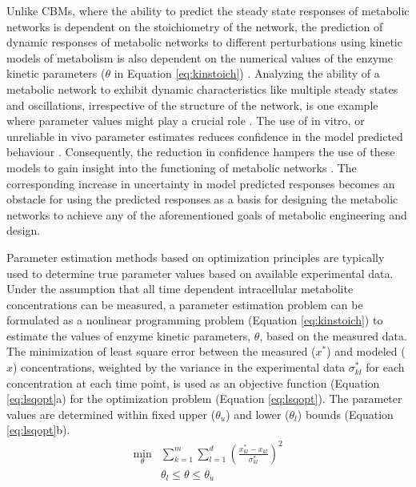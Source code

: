 \documentclass[10pt]{article}
\begin{document}
	Unlike CBMs, where the ability to predict the steady state responses of metabolic networks is dependent on the stoichiometry of the network, the prediction of dynamic responses of metabolic networks to different perturbations using kinetic models of metabolism is also dependent on the numerical values of the enzyme kinetic parameters ($\theta$ in Equation \ref{eq:kinstoich}) \parencite{Andreozzi2016a}. Analyzing the ability of a metabolic network to exhibit dynamic characteristics like multiple steady states and oscillations, irrespective of the structure of the network, is one example where parameter values might play a crucial role \parencite{Srinivasan2015, Vital-Lopez2006}. The use of in vitro, or unreliable in vivo parameter estimates reduces confidence in the model predicted behaviour \parencite{Andreozzi2016a}. Consequently, the reduction in confidence hampers the use of these models to gain insight into the functioning of metabolic networks \parencite{Chakrabarti2013a, Bordbar2015}. The corresponding increase in uncertainty in model predicted responses becomes an obstacle for using the predicted responses as a basis for designing the metabolic networks to achieve any of the aforementioned goals of metabolic engineering and design.  
	
	Parameter estimation methods based on optimization principles are typically used to determine true parameter values based on available experimental data. Under the assumption that all time dependent intracellular metabolite concentrations can be measured, a parameter estimation problem can be formulated as a nonlinear programming problem (Equation \ref{eq:kinstoich}) to estimate the values of enzyme kinetic parameters, $\theta$, based on the measured data. 	
	The minimization of least square error between the measured ($x^*$) and modeled ($x$) concentrations, weighted by the variance in the experimental data $\sigma_{kl}^*$ for each concentration at each time point, is used as an objective function (Equation \ref{eq:lsqopt}a) for the optimization problem (Equation \ref{eq:lsqopt}). The parameter values are determined within fixed upper ($\theta_u$) and lower ($\theta_l$) bounds (Equation \ref{eq:lsqopt}b). 
	\begin{subequations}\label{eq:lsqopt}
		\begin{align}
		\underset{\theta}{\mathrm{min}} &\sum_{k=1}^{m}\sum_{l=1}^{d}\left(\frac{x_{kl}^*-x_{kl}}{\sigma_{kl}^*}\right)^2\\
		&\theta_l \le \theta \le \theta_u
		\end{align}
	\end{subequations}
	
\end{document}
